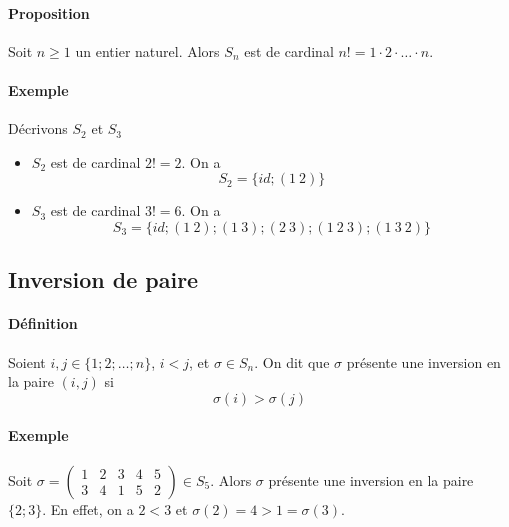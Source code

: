\paragraph{Proposition} Soit $n \geq 1$ un entier naturel. Alors $S_n$ est de cardinal $n! = 1 \cdot 2 \cdot \ldots \cdot n$.


\paragraph{Exemple} Décrivons $S_2$ et $S_3$
\begin{itemize}
  \item $S_2$ est de cardinal $2! = 2$. On a 
    $$S_2 = \{id; (1 ~ 2)\}$$
  \item $S_3$ est de cardinal $3! = 6$. On a
    $$S_3 = \{id; (1 ~ 2); (1 ~ 3); (2 ~ 3); (1 ~ 2 ~ 3); (1 ~ 3 ~ 2)\}$$
\end{itemize}

%
\subsection{Inversion de paire}
%
\paragraph{Définition} Soient $i, j \in \{1; 2; \ldots; n\}$, $i < j$, et $\sigma \in S_n$. On dit que $\sigma$ présente une inversion en la paire $(i, j)$ si 
$$\sigma(i) > \sigma(j)$$

\paragraph{Exemple} Soit $\sigma = \begin{pmatrix} 1 & 2 & 3 & 4 & 5 \\ 3 & 4 & 1 & 5 & 2 \end{pmatrix} \in S_5$. Alors $\sigma$ présente une inversion en la paire $\{2; 3\}$. En effet, on a $2 < 3$ et $\sigma(2) = 4 > 1 = \sigma(3)$.


